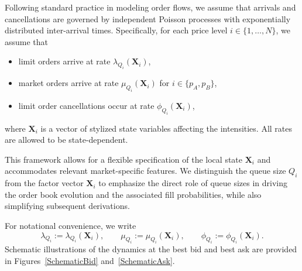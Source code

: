\documentclass[11pt]{article}
\begin{document}
Following standard practice in modeling order flows, we assume that arrivals and cancellations are governed by independent Poisson processes with exponentially distributed inter-arrival times. Specifically, for each price level $i\in\{1,\ldots,N\}$, we assume that
\begin{itemize}
    \item limit orders arrive at rate $\lambda_{Q_i}(\boldsymbol{X}_i)$,
    \item market orders arrive at rate $\mu_{Q_i}(\boldsymbol{X}_i)$ for $i\in\{p_A,p_B\}$,
    \item limit order cancellations occur at rate $\phi_{Q_i}(\boldsymbol{X}_i)$,
\end{itemize}
where $\boldsymbol{X}_i$ is a vector of stylized state variables affecting the intensities. All rates are allowed to be state-dependent.

This framework allows for a flexible specification of the local state $\boldsymbol{X}_i$ and accommodates relevant market-specific features. We distinguish the queue size $Q_i$ from the factor vector $\boldsymbol{X}_i$ to emphasize the direct role of queue sizes in driving the order book evolution and the associated fill probabilities, while also simplifying subsequent derivations.

For notational convenience, we write
\[
\lambda_{Q_i}:=\lambda_{Q_i}(\boldsymbol{X}_i), 
\qquad 
\mu_{Q_i}:=\mu_{Q_i}(\boldsymbol{X}_i), 
\qquad 
\phi_{Q_i}:=\phi_{Q_i}(\boldsymbol{X}_i).
\]
Schematic illustrations of the dynamics at the best bid and best ask are provided in Figures~\ref{SchematicBid} and~\ref{SchematicAsk}.
\end{document}
